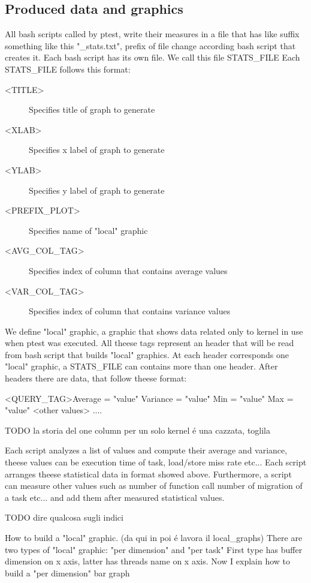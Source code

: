 \documentclass[a4paper,10pt]{article}
\begin{document}
\begin{multicols}{2}
\section{Produced data and graphics}

All bash scripts called by ptest, write their measures in a file that has like
suffix something like this "\_stats.txt", prefix of file change according bash 
script that creates it. Each bash script has its own file. We call this file STATS\_FILE 
Each STATS\_FILE follows this format:

\begin{description}
	\item[<TITLE>] Specifies title of graph to generate
	\item[<XLAB>] Specifies x label of graph to generate
	\item[<YLAB>] Specifies y label of graph to generate
	\item[<PREFIX\_PLOT>] Specifies name of "local" graphic
	\item[<AVG\_COL\_TAG>] Specifies index of column that contains average values
	\item[<VAR\_COL\_TAG>] Specifies index of column that contains variance values
\end{description}

We define "local" graphic, a graphic that shows data related only to 
kernel in use when ptest was executed.
All theese tags represent an header that will be read from bash script that builds 
"local" graphics. At each header corresponds one "local" graphic, a STATS\_FILE can 
contains more than one header. 
After headers there are data, that follow theese format:


<QUERY\_TAG>Average = "value" Variance = "value" Min = "value" Max = "value" <other values>
....

TODO la storia del one column per un solo kernel \'e una cazzata, toglila

Each script analyzes a list of values and compute their average and variance,
theese values can be execution time of task, load/store miss rate etc...
Each script arranges theese statistical data in format showed above.
Furthermore, a script can measure other values such as number of function call
number of migration of a task etc... and add them after measured statistical values.

TODO dire qualcosa sugli indici 

How to build a "local" graphic. (da qui in poi \'e lavora il local\_graphs)
There are two types of "local" graphic: "per dimension"  and "per task" 
First type has buffer dimension on x axis, latter has threads name on x axis.
Now I explain how to build a "per dimension" bar graph


\end{multicols}
\end{document}
